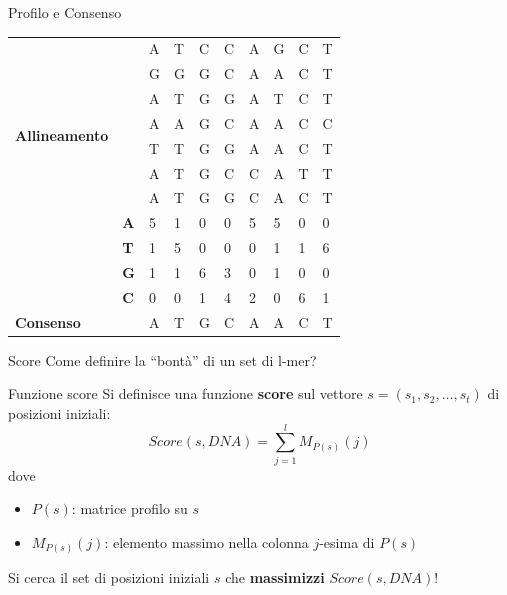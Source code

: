 	\begin{frame}{Profilo e Consenso}
		\begin{center}
			\begin{tabular}{l l l l l l l l l l}
				\multirow{8}{*}{\textbf{Allineamento}} & & A & T & C & C & A & G & C & T\\
				& & G & G & G & C & A & A & C & T\\
				& & A & T & G & G & A & T & C & T\\
				& & A & A & G & C & A & A & C & C\\
				& & T & T & G & G & A & A & C & T\\
				& & A & T & G & C & C & A & T & T\\
				& & A & T & G & G & C & A & C & T\\
				\hline
				\multirow{4}{*}{\textbf{Profilo}} & \textbf{A} & 5 & 1 & 0 & 0 & 5 & 5 & 0 & 0\\
				& \textbf{T} & 1 & 5 & 0 & 0 & 0 & 1 & 1 & 6\\
				& \textbf{G} & 1 & 1 & 6 & 3 & 0 & 1 & 0 & 0\\
				& \textbf{C} & 0 & 0 & 1 & 4 & 2 & 0 & 6 & 1\\
				\hline
				\textbf{Consenso} & & A & T & G & C & A & A & C & T 
			\end{tabular}
		\end{center}
	\end{frame}
	
	\begin{frame}{Score}
		Come definire la ``bontà'' di un set di l-mer?
		\begin{block}{Funzione score}
			Si definisce una funzione \alert{\textbf{score}} sul vettore $s=(s_1,s_2,\dots,s_t)$ di posizioni iniziali:
			\begin{equation*}
				Score(s,DNA)=\sum_{j=1}^{l}M_{P(s)}(j)
			\end{equation*}
			dove
			\begin{itemize}
				\item $P(s)$: matrice profilo su $s$
				\item $M_{P(s)}(j)$: elemento massimo nella colonna $j$-esima di $P(s)$
			\end{itemize}
		\end{block}
		Si cerca il set di posizioni iniziali $s$ che \alert{\textbf{massimizzi}} $Score(s,DNA)$!
	\end{frame}
	
